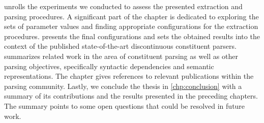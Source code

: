 \documentclass[../document.tex]{subfiles}
\begin{document}
     unrolls the experiments we conducted to assess the presented extraction and parsing procedures.
    A significant part of the chapter is dedicated to exploring the sets of parameter values and finding appropriate configurations for the extraction procedures.
     presents the final configurations and sets the obtained results into the context of the published state-of-the-art discontinuous constituent parsers.
     summarizes related work in the area of constituent parsing as well as other parsing objectives, specifically syntactic dependencies and semantic representations.
    The chapter gives references to relevant publications within the parsing community.
    Lastly, we conclude the thesis in \cref{chp:conclusion} with a summary of its contributions and the results presented in the preceding chapters.
    The summary points to some open questions that could be resolved in future work.

    \ifSubfilesClassLoaded{%
        \printindex
    }{}
\end{document}
